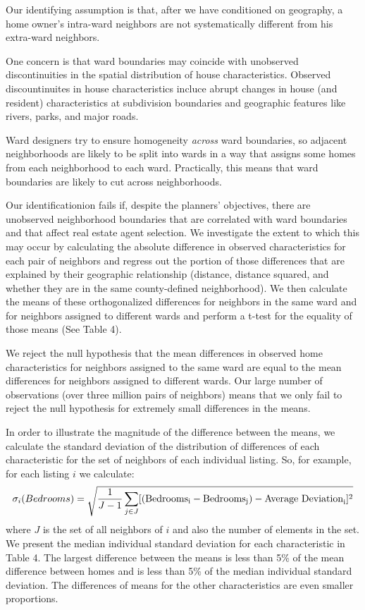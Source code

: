 \documentclass[AEJ,draftmode]{AEA}
\begin{document}
    Our identifying assumption is that, after we have conditioned on geography, a home owner's intra-ward neighbors are not systematically different from his extra-ward neighbors.

    One concern is that ward boundaries may coincide with unobserved discontinuities in the spatial distribution of house characteristics.  Observed discountinuites in house characteristics incluce abrupt changes in house (and resident) characteristics at subdivision boundaries and geographic features like rivers, parks, and major roads.

    Ward designers try to ensure homogeneity \emph{across} ward boundaries, so adjacent neighborhoods are likely to be split into wards in a way that assigns some homes from each neighborhood to each ward. Practically, this means that ward boundaries are likely to cut across neighborhoods.

    Our identificationion fails if, despite the planners' objectives, there are unobserved neighborhood boundaries that are correlated with ward boundaries and that affect real estate agent selection. We investigate the extent to which this may occur by calculating the absolute difference in observed characteristics for each pair of neighbors and regress out the portion of those differences that are explained by their geographic relationship (distance, distance squared, and whether they are in the same county-defined neighborhood). We then calculate the means of these orthogonalized differences for neighbors in the same ward and for neighbors assigned to different wards and perform a t-test for the equality of those means (See Table 4).

    We reject the null hypothesis that the mean differences in observed home characteristics for neighbors assigned to the same ward are equal to the
    mean differences for neighbors assigned to different wards. Our large number of observations (over three million pairs of neighbors) means that we only fail to reject the null hypothesis for extremely small differences in the means.

    In order to illustrate the magnitude of the difference between the means, we calculate the standard deviation of the distribution of differences of each characteristic for the set of neighbors of each individual listing. So, for example, for each listing $i$ we calculate: \[\sigma_i(Bedrooms) = \sqrt{\frac{1}{J-1}\sum_{j \in J}[(\rm{Bedrooms}_i - \rm{Bedrooms}_j) - \rm{Average \ Deviation}_i]^2}\] where $J$ is the set of all neighbors of $i$ and also the number of elements in the set. We present the median individual standard deviation for each characteristic in Table 4. The largest difference between the means is less than 5\% of the mean difference between homes and is less than 5\% of the median individual standard deviation. The differences of means for the other characteristics are even smaller proportions.
\end{document}
